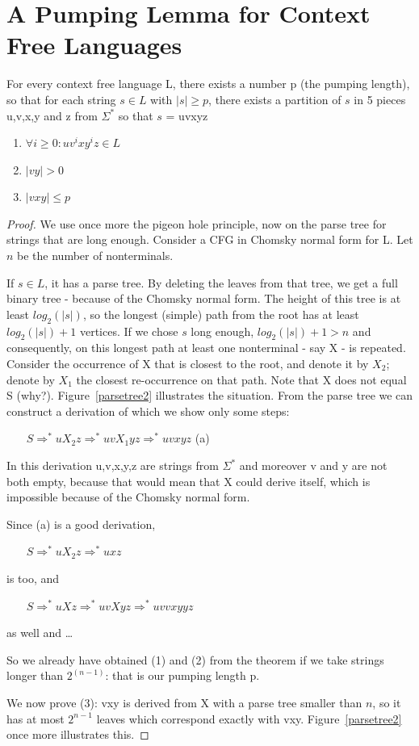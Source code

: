 

\section{A Pumping Lemma for Context Free Languages}\label{pompcfl}

\begin{theorem}
For every context free language L, there exists a number p (the
pumping length), so that for each string $s \in L$ with $|s| \geq p$,
there exists a partition of $s$ in 5 pieces u,v,x,y and z from
$\Sigma^*$ so that $s$ = uvxyz
\begin{enumerate}
\item $\forall i \geq 0: uv^ixy^iz \in L$
\item $|vy| > 0$
\item $|vxy| \leq p$
\end{enumerate}
\end{theorem}
\begin{proof}
We use once more the pigeon hole principle, now on the parse tree for
strings that are long enough. Consider a CFG in Chomsky normal form
for L. Let $n$ be the number of nonterminals.

If $s \in L$, it has a parse tree. By deleting the
leaves from that tree, we get a full binary tree - because of the Chomsky normal
form. The height of this tree is at least $log_2(|s|)$, so the longest
(simple) path from the root has at least $log_2(|s|) + 1$ vertices. If
we chose $s$ long enough, $log_2(|s|) + 1 > n$ and consequently, on
this longest path at least one nonterminal - say X - is
repeated. Consider the occurrence of X that is closest to the root,
and denote it by $X_2$; denote by $X_1$ the closest re-occurrence on
that path. Note that X does not equal S
(why?). Figure~\ref{parsetree2} illustrates the situation. From the
parse tree we can construct a derivation of which we show only some
steps:


$~~~~~~~~S \Rightarrow^* uX_2z \Rightarrow^* uvX_1yz \Rightarrow^* uvxyz$ (a)

In this derivation u,v,x,y,z are strings from $\Sigma^*$ and moreover
v and y are not both empty, because that would mean that X could
derive itself, which is impossible because of the Chomsky normal form.

Since (a) is a good derivation,


$~~~~~~~~S \Rightarrow^* uX_2z \Rightarrow^* uxz$

is too, and



$~~~~~~~~S \Rightarrow^* uXz \Rightarrow^* uvXyz \Rightarrow^* uvvxyyz$


as well and \ldots

So we already have obtained (1) and (2) from the theorem if we take strings longer than $2^{(n-1)}$: that is our pumping length p.


We now prove (3): vxy is derived from X with a parse tree smaller than
$n$, so it has at most $2^{n-1}$ leaves which correspond exactly with
vxy. Figure~\ref{parsetree2} once more illustrates this.
\end{proof}

